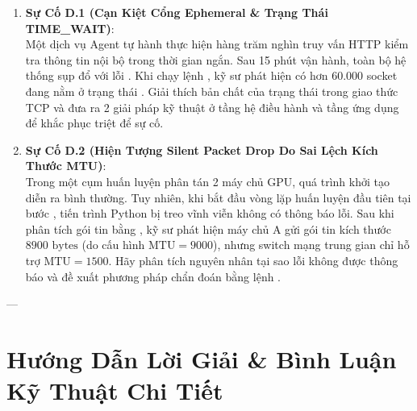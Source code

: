 \begin{enumerate}
  \item \textbf{Sự Cố D.1 (Cạn Kiệt Cổng Ephemeral \& Trạng Thái TIME\_WAIT)}: \\
  Một dịch vụ Agent tự hành thực hiện hàng trăm nghìn truy vấn HTTP kiểm tra thông tin nội bộ trong thời gian ngắn. Sau 15 phút vận hành, toàn bộ hệ thống sụp đổ với lỗi . Khi chạy lệnh , kỹ sư phát hiện có hơn $60.000$ socket đang nằm ở trạng thái . Giải thích bản chất của trạng thái  trong giao thức TCP và đưa ra 2 giải pháp kỹ thuật ở tầng hệ điều hành và tầng ứng dụng để khắc phục triệt để sự cố.

  \item \textbf{Sự Cố D.2 (Hiện Tượng Silent Packet Drop Do Sai Lệch Kích Thước MTU)}: \\
  Trong một cụm huấn luyện phân tán 2 máy chủ GPU, quá trình khởi tạo diễn ra bình thường. Tuy nhiên, khi bắt đầu vòng lặp huấn luyện đầu tiên tại bước , tiến trình Python bị treo vĩnh viễn không có thông báo lỗi. Sau khi phân tích gói tin bằng , kỹ sư phát hiện máy chủ A gửi gói tin kích thước $8900\text{ bytes}$ (do cấu hình $\text{MTU} = 9000$), nhưng switch mạng trung gian chỉ hỗ trợ $\text{MTU} = 1500$. Hãy phân tích nguyên nhân tại sao lỗi không được thông báo và đề xuất phương pháp chẩn đoán bằng lệnh .
\end{enumerate}

---

\section{Hướng Dẫn Lời Giải \& Bình Luận Kỹ Thuật Chi Tiết}
\label{sec:ch03-solutions}

